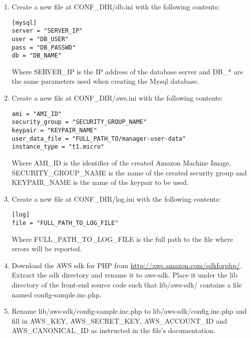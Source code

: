 \documentclass[12pt]{article}
\newenvironment{framedbox}[1]%
{\begin{framed}
 \begingroup
 \fontsize{#1}{#1}\selectfont
}
{
 \endgroup
 \end{framed}
}
\begin{document}
\begin{enumerate}
\item Create a new file at CONF\_DIR/db.ini with the following contents:
\begin{framedbox}{12pt}\begin{verbatim}
[mysql]
server = "SERVER_IP"
user = "DB_USER"
pass = "DB_PASSWD"
db = "DB_NAME"
\end{verbatim}\end{framedbox}
      Where SERVER\_IP is the IP address of the database server and DB\_* are the
      same parameters used when creating the Mysql database.
\item Create a new file at CONF\_DIR/aws.ini with the following contents:
\begin{framedbox}{12pt}\begin{verbatim}
ami = "AMI_ID"
security_group = "SECURITY_GROUP_NAME"
keypair = "KEYPAIR_NAME"
user_data_file = "FULL_PATH_TO/manager-user-data"
instance_type = "t1.micro"
\end{verbatim}\end{framedbox}
      Where AMI\_ID is the identifier of the created Amazon Machine Image,
      SECURITY\_GROUP\_NAME is the name of the created security group and
      KEYPAIR\_NAME is the name of the keypair to be used.
\item Create a new file at CONF\_DIR/log.ini with the following contents:
\begin{framedbox}{12pt}\begin{verbatim}
[log]
file = "FULL_PATH_TO_LOG_FILE"
\end{verbatim}\end{framedbox}
Where FULL\_PATH\_TO\_LOG\_FILE is the full path to the file where errors will be reported.
\item Download the AWS sdk for PHP from
\href{http://aws.amazon.com/sdkforphp/}{http://aws.amazon.com/sdkforphp/}.
Extract the sdk directory and rename it to aws-sdk. Place it under the lib
directory of the front-end source code such that lib/aws-sdk/ contains a file
named config-sample.inc.php.
\item Rename lib/aws-sdk/config-sample.inc.php to lib/aws-sdk/config.inc.php
and fill in AWS\_KEY, AWS\_SECRET\_KEY, AWS\_ACCOUNT\_ID and
AWS\_CANONICAL\_ID as instructed in the file's documentation.
\end{enumerate}
\end{document}
